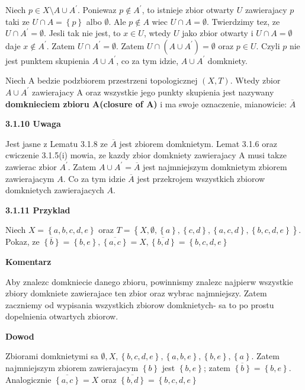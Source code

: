 \documentclass{article}
\begin{document}
Niech $p \in X \setminus A \cup A^{\prime}$. Poniewaz $p \notin A^{\prime}$, to istnieje zbior otwarty $U$ zawierajacy $p$ taki ze $U \cap A = \left\{ p \right\}$ albo $\emptyset$. Ale $p\notin A$ wiec $U\cap A = \emptyset$. Twierdzimy tez, ze $U \cap A^{\prime} = \emptyset$. Jesli tak nie jest, to $x \in U$, wtedy $U$ jako zbior otwarty i $U\cap A = \emptyset$ daje $x\notin A^{\prime}$. Zatem $U\cap A^{\prime} = \emptyset$. Zatem $U \cap (A\cup A^{\prime}) = \emptyset$ oraz $p\in U$. Czyli $p$ nie jest punktem skupienia $A\cup A^{\prime}$, co za tym idzie, $A\cup A^{\prime}$ domkniety.

\begin{tcolorbox}[colback=white!90!red,colframe=black!35!red,title=3.1.9 Definicja: Domkniecie zbioru A(closure of A)]

    Niech A bedzie podzbiorem przestrzeni topologicznej $(X,T)$. Wtedy zbior $A\cup A^{\prime}$ zawierajacy A oraz wszystkie jego punkty skupienia jest nazywany \textbf{domknieciem zbioru A(closure of A)} i ma swoje oznaczenie, mianowicie: $\overline{A}$

\end{tcolorbox}

\textbf{3.1.10 Uwaga}

Jest jasne z Lematu 3.1.8 ze $\overline{A}$ jest zbiorem domknietym. Lemat 3.1.6 oraz cwiczenie 3.1.5(i) mowia, ze kazdy zbior domkniety zawierajacy A musi takze zawierac zbior $A^{\prime}$. Zatem $A \cup A^{\prime} = \overline{A}$ jest najmniejszym domknietym zbiorem zawierajacym $A$. Co za tym idzie $\overline{A}$ jest przekrojem wszystkich zbiorow domknietych zawierajacych $A$.

\textbf{3.1.11 Przyklad}

Niech $X = \left\{ a,b,c,d,e \right\}$ oraz $T = \left\{ X, \emptyset, \left\{ a \right\}, \left\{ c,d \right\}, \left\{ a,c,d \right\}, \left\{ b,c,d,e \right\}  \right\}$. Pokaz, ze $\overline{\left\{b\right\}} = \left\{ b,e \right\}, \overline{\left\{a,c\right\}} = X, \overline{\left\{b,d\right\}} = \left\{ b,c,d,e \right\} $

\textbf{Komentarz}

Aby znalezc domkniecie danego zbioru, powinnismy znalezc najpierw wszystkie zbiory domkniete zawierajace ten zbior oraz wybrac najmniejszy. Zatem zaczniemy od wypisania wszystkich zbiorow domknietych- sa to po prostu dopelnienia otwartych zbiorow.

\textbf{Dowod}

Zbiorami domknietymi sa $\emptyset, X, \left\{ b,c,d,e \right\}, \left\{ a,b,e \right\}, \left\{ b, e \right\}, \left\{ a \right\}$. Zatem najmniejszym zbiorem zawierajacym $\left\{ b \right\}$ jest $\left\{ b,e \right\}$; zatem  $\overline{\left\{b\right\}} = \left\{ b,e \right\}$. Analogicznie $\overline{\left\{a,c\right\}} = X$ oraz $\overline{\left\{b,d\right\}} = \left\{ b,c,d,e \right\}$ 
\end{document}
